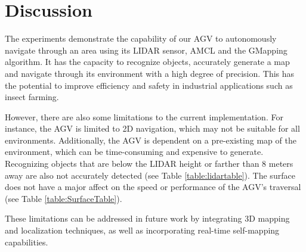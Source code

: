 \section{Discussion}
The experiments demonstrate the capability of our AGV to autonomously navigate through an area using its LIDAR sensor, AMCL and the GMapping algorithm. It has the capacity to recognize objects, accurately generate a map and navigate through its environment with a high degree of precision. This has the potential to improve efficiency and safety in industrial applications such as insect farming.

However, there are also some limitations to the current implementation. For instance, the AGV is limited to 2D navigation, which may not be suitable for all environments. Additionally, the AGV is dependent on a pre-existing map of the environment, which can be time-consuming and expensive to generate. Recognizing objects that are below the LIDAR height or farther than 8 meters away are also not accurately detected (see Table \ref{table:lidartable}). 
The surface does not have a major affect on the speed or performance of the AGV's traversal (see Table \ref{table:SurfaceTable}).

These limitations can be addressed in future work by integrating 3D mapping and localization techniques, as well as incorporating real-time self-mapping capabilities.



